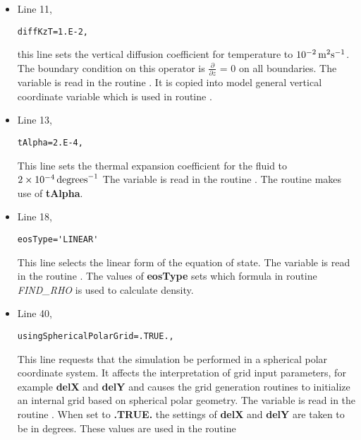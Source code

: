\begin{itemize}
\item Line 11,
\begin{verbatim}
diffKzT=1.E-2,
\end{verbatim}
  this line sets the vertical diffusion coefficient for temperature to
  $10^{-2}\,{\rm m^{2}s^{-1}}$. The boundary condition on this
  operator is $\frac{\partial}{\partial z}$ = 0 on all boundaries.
  The variable  is read in the routine
  . It is copied into model general
  vertical coordinate variable  which is
  used in routine .


\item Line 13,
\begin{verbatim}
tAlpha=2.E-4,
\end{verbatim}
  This line sets the thermal expansion coefficient for the fluid to $2
  \times 10^{-4}\,{\rm degrees}^{-1}$ The variable
   is read in the routine
  . The routine
   makes use of {\bf tAlpha}.


\item Line 18,
\begin{verbatim}
eosType='LINEAR'
\end{verbatim}
  This line selects the linear form of the equation of state.  The
  variable  is read in the routine
  . The values of {\bf eosType} sets
  which formula in routine {\it FIND\_RHO} is used to calculate
  density.


\item Line 40,
\begin{verbatim}
usingSphericalPolarGrid=.TRUE.,
\end{verbatim}
  This line requests that the simulation be performed in a spherical
  polar coordinate system. It affects the interpretation of grid input
  parameters, for example {\bf delX} and {\bf delY} and causes the
  grid generation routines to initialize an internal grid based on
  spherical polar geometry.  The variable
   is read
  in the routine . When set to {\bf
    .TRUE.} the settings of {\bf delX} and {\bf delY} are taken to be
  in degrees. These values are used in the routine


\end{itemize}

